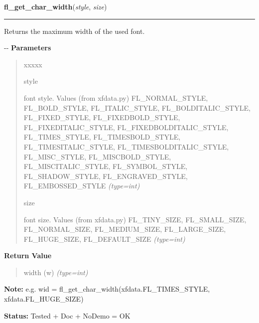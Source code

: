     \label{xformslib:flbasic:fl_get_char_width}

    \vspace{0.5ex}

\hspace{.8\funcindent}\begin{boxedminipage}{\funcwidth}

    \raggedright \textbf{fl\_get\_char\_width}(\textit{style}, \textit{size})

    \vspace{-1.5ex}

    \rule{\textwidth}{0.5\fboxrule}
\setlength{\parskip}{2ex}

Returns the maximum width of the used font.

-{}-
\setlength{\parskip}{1ex}
      \textbf{Parameters}
      \vspace{-1ex}

      \begin{quote}
        \begin{Ventry}{xxxxx}

          \item[style]


font style. Values (from xfdata.py) FL\_NORMAL\_STYLE, FL\_BOLD\_STYLE,
FL\_ITALIC\_STYLE, FL\_BOLDITALIC\_STYLE, FL\_FIXED\_STYLE,
FL\_FIXEDBOLD\_STYLE, FL\_FIXEDITALIC\_STYLE, FL\_FIXEDBOLDITALIC\_STYLE,
FL\_TIMES\_STYLE, FL\_TIMESBOLD\_STYLE, FL\_TIMESITALIC\_STYLE,
FL\_TIMESBOLDITALIC\_STYLE, FL\_MISC\_STYLE, FL\_MISCBOLD\_STYLE,
FL\_MISCITALIC\_STYLE, FL\_SYMBOL\_STYLE, FL\_SHADOW\_STYLE,
FL\_ENGRAVED\_STYLE, FL\_EMBOSSED\_STYLE
            {\it (type=int)}

          \item[size]


font size. Values (from xfdata.py) FL\_TINY\_SIZE, FL\_SMALL\_SIZE,
FL\_NORMAL\_SIZE, FL\_MEDIUM\_SIZE, FL\_LARGE\_SIZE, FL\_HUGE\_SIZE,
FL\_DEFAULT\_SIZE
            {\it (type=int)}

        \end{Ventry}

      \end{quote}

      \textbf{Return Value}
    \vspace{-1ex}

      \begin{quote}

width (w)
      {\it (type=int)}

      \end{quote}

\textbf{Note:} 
e.g. wid = fl\_get\_char\_width(xfdata.FL\_TIMES\_STYLE,
xfdata.FL\_HUGE\_SIZE)


\textbf{Status:} 
Tested + Doc + NoDemo = OK


    \end{boxedminipage}

